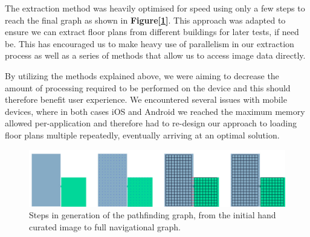 \documentclass[main.tex]{subfiles}
\begin{document}
The extraction method was heavily optimised for speed using only a few steps to reach the final graph as shown in \textbf{Figure[\ref{fig:nav_graph}]}. This approach was adapted to ensure we can extract floor plans from different buildings for later tests, if need be. This has encouraged us to make heavy use of parallelism in our extraction process as well as a series of methods that allow us to access image data directly. 
\newline

By utilizing the methods explained above, we were aiming to decrease the amount of processing required to be performed on the device and this should therefore benefit user experience. We encountered several issues with mobile devices, where in both cases iOS and Android we reached the maximum memory allowed per-application and therefore had to re-design our approach to loading floor plans multiple repeatedly, eventually arriving at an optimal solution.
\begin{figure}[h]
\center
\includegraphics[trim=0 0 0 0, clip,width=\textwidth,height=\textheight,keepaspectratio]{images/graphGeneration.pdf}
\caption{Steps in generation of the pathfinding graph, from the initial hand curated image to full navigational graph.}
\label{fig:nav_graph}
\end{figure}
\end{document}
